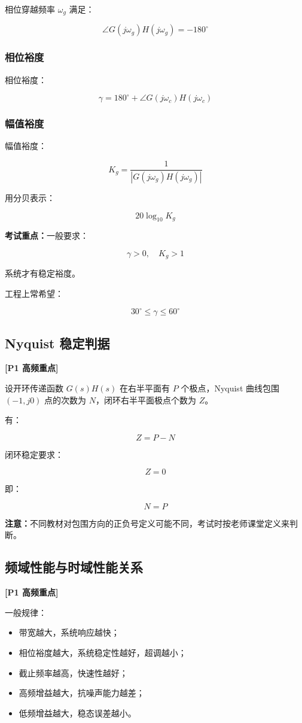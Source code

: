 \documentclass[UTF8,a4paper,12pt]{ctexart}
\newcommand{\Pone}{\textcolor{p1}{\textbf{[P1 高频重点]}}}
\newcommand{\exam}{\textcolor{p0}{\textbf{考试重点：}}}
\newcommand{\note}{\textcolor{note}{\textbf{注意：}}}
\begin{document}
相位穿越频率 $\omega_g$ 满足：

\[
\angle G(j\omega_g)H(j\omega_g)=-180^\circ
\]

\subsubsection{相位裕度}

相位裕度：

\[
\gamma=180^\circ+\angle G(j\omega_c)H(j\omega_c)
\]

\subsubsection{幅值裕度}

幅值裕度：

\[
K_g=\frac{1}{|G(j\omega_g)H(j\omega_g)|}
\]

用分贝表示：

\[
20\log_{10}K_g
\]

\exam 一般要求：

\[
\gamma>0,\quad K_g>1
\]

系统才有稳定裕度。

工程上常希望：

\[
30^\circ \leq \gamma \leq 60^\circ
\]

\subsection{Nyquist 稳定判据}

\Pone

设开环传递函数 $G(s)H(s)$ 在右半平面有 $P$ 个极点，Nyquist 曲线包围 $(-1,j0)$ 点的次数为 $N$，闭环右半平面极点个数为 $Z$。

有：

\[
Z=P-N
\]

闭环稳定要求：

\[
Z=0
\]

即：

\[
N=P
\]

\note 不同教材对包围方向的正负号定义可能不同，考试时按老师课堂定义来判断。

\subsection{频域性能与时域性能关系}

\Pone

一般规律：

\begin{itemize}
    \item 带宽越大，系统响应越快；
    \item 相位裕度越大，系统稳定性越好，超调越小；
    \item 截止频率越高，快速性越好；
    \item 高频增益越大，抗噪声能力越差；
    \item 低频增益越大，稳态误差越小。
\end{itemize}
\end{document}
